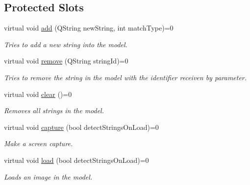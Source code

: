 \subsection*{Protected Slots}
\begin{DoxyCompactItemize}
\item 
virtual void \mbox{\hyperlink{classContextualizationController_afea4c16fa2728506e6301e46891bf73f}{add}} (Q\+String new\+String, int match\+Type)=0
\begin{DoxyCompactList}\small\item\em Tries to add a new string into the model. \end{DoxyCompactList}\item 
virtual void \mbox{\hyperlink{classContextualizationController_ae06d4c794e77321439668aadc141aca5}{remove}} (Q\+String string\+Id)=0
\begin{DoxyCompactList}\small\item\em Tries to remove the string in the model with the identifier receiven by parameter. \end{DoxyCompactList}\item 
\mbox{\label{classContextualizationController_a2f19977180ae0d6ecd3900951d686fe3}} 
virtual void \mbox{\hyperlink{classContextualizationController_a2f19977180ae0d6ecd3900951d686fe3}{clear}} ()=0
\begin{DoxyCompactList}\small\item\em Removes all strings in the model. \end{DoxyCompactList}\item 
virtual void \mbox{\hyperlink{classContextualizationController_ad9e65625e6dc228858cf2c9606606691}{capture}} (bool detect\+Strings\+On\+Load)=0
\begin{DoxyCompactList}\small\item\em Make a screen capture. \end{DoxyCompactList}\item 
virtual void \mbox{\hyperlink{classContextualizationController_a3b93cb8ddf7ec41936d0e3ab980644eb}{load}} (bool detect\+Strings\+On\+Load)=0
\begin{DoxyCompactList}\small\item\em Loads an image in the model. \end{DoxyCompactList}\item 
\mbox{\label{classContextualizationController_a0b79fa3dbd9e95325df5d1bd8507c7a5}} 

\end{DoxyCompactItemize}
